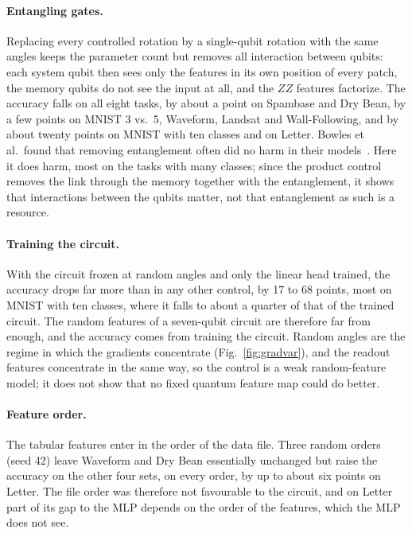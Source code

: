 \documentclass[11pt]{article}
\begin{document}
\paragraph{Entangling gates.}
Replacing every controlled rotation by a single-qubit rotation with the same angles keeps the parameter count but removes all interaction between qubits: each system qubit then sees only the features in its own position of every patch, the memory qubits do not see the input at all, and the $ZZ$ features factorize. The accuracy falls on all eight tasks, by about a point on Spambase and Dry Bean, by a few points on MNIST 3 vs.\ 5, Waveform, Landsat and Wall-Following, and by about twenty points on MNIST with ten classes and on Letter. Bowles et al.\ found that removing entanglement often did no harm in their models~\cite{bowles2024better}. Here it does harm, most on the tasks with many classes; since the product control removes the link through the memory together with the entanglement, it shows that interactions between the qubits matter, not that entanglement as such is a resource.

\paragraph{Training the circuit.}
With the circuit frozen at random angles and only the linear head trained, the accuracy drops far more than in any other control, by 17 to 68 points, most on MNIST with ten classes, where it falls to about a quarter of that of the trained circuit. The random features of a seven-qubit circuit are therefore far from enough, and the accuracy comes from training the circuit. Random angles are the regime in which the gradients concentrate (Fig.~\ref{fig:gradvar}), and the readout features concentrate in the same way, so the control is a weak random-feature model; it does not show that no fixed quantum feature map could do better.

\paragraph{Feature order.}
The tabular features enter in the order of the data file. Three random orders (seed 42) leave Waveform and Dry Bean essentially unchanged but raise the accuracy on the other four sets, on every order, by up to about six points on Letter. The file order was therefore not favourable to the circuit, and on Letter part of its gap to the MLP depends on the order of the features, which the MLP does not see.
\end{document}
